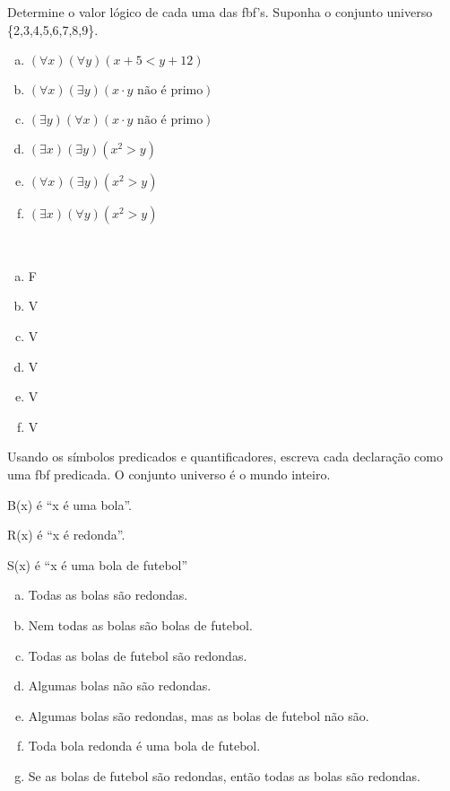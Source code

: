 \documentclass[a4paper, 12pt, addpoints]{exam}
\begin{document}
\begin{questions}
  \question  Determine o valor lógico de cada uma das fbf's. Suponha o conjunto universo \{2,3,4,5,6,7,8,9\}.
  \begin{multicols}{2}
    \begin{enumerate}[a)]
      \item $(\forall x)(\forall y)(x + 5 < y + 12)$
      \item $(\forall x)(\exists y)(x \cdot y \text{ não é primo})$
      \item $(\exists y)(\forall x)(x \cdot y \text{ não é primo})$
      \item $(\exists x)(\exists y)(x^2 > y)$
      \item $(\forall x)(\exists y)(x^2 > y)$
      \item $(\exists x)(\forall y)(x^2 > y)$
    \end{enumerate}
  \end{multicols}

  \begin{resp}~
    \begin{multicols}{4}
      \begin{enumerate}[a)]
        \item F
        \item V
        \item V
        \item V
        \item V
        \item V
      \end{enumerate}
    \end{multicols}
  \end{resp}

  \question  Usando os símbolos predicados e quantificadores, escreva cada declaração como uma fbf predicada. O conjunto universo é o mundo inteiro.

  B(x) é “x é uma bola”.

  R(x) é “x é redonda”.

  S(x) é “x é uma bola de futebol”

  \begin{enumerate}[a)]
    \item Todas as bolas são redondas.
    \item Nem todas as bolas são bolas de futebol.
    \item Todas as bolas de futebol são redondas.
    \item Algumas bolas não são redondas.
    \item Algumas bolas são redondas, mas as bolas de futebol não são.
    \item Toda bola redonda é uma bola de futebol.
    \item Se as bolas de futebol são redondas, então todas as bolas são redondas.
  \end{enumerate}


\end{questions}
\end{document}
